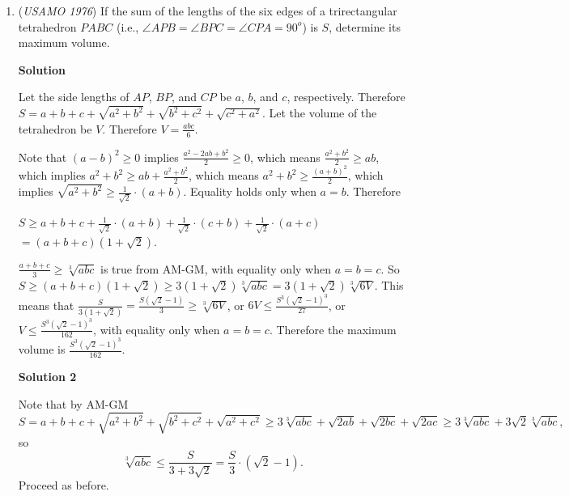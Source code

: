 \begin{enumerate}
 Thus the only solution is the solution above: $(a,b,c)=0$.

 


 
<i>Alternate solutions are always welcome. If you have a different, elegant solution to this problem, please \href{https://artofproblemsolving.com/wiki/index.php?title=1976\_USAMO\_Problems/Problem\_3&action=edit}{add it} to this page.</i>



	\item (\textit{USAMO 1976}) If the sum of the lengths of the six edges of a trirectangular tetrahedron $PABC$ (i.e., $\angle APB=\angle BPC=\angle CPA=90^o$) is $S$, determine its maximum volume.


 



\textbf{Solution}

Let the side lengths of $AP$, $BP$, and $CP$ be $a$, $b$, and $c$, respectively. Therefore $S=a+b+c+\sqrt{a^2+b^2}+\sqrt{b^2+c^2}+\sqrt{c^2+a^2}$. Let the volume of the tetrahedron be $V$. Therefore $V=\frac{abc}{6}$.

 Note that $(a-b)^2\geq 0$ implies $\frac{a^2-2ab+b^2}{2}\geq 0$, which means $\frac{a^2+b^2}{2}\geq ab$, which implies $a^2+b^2\geq ab+\frac{a^2+b^2}{2}$, which means $a^2+b^2\geq \frac{(a+b)^2}{2}$, which implies $\sqrt{a^2+b^2}\geq \frac{1}{\sqrt{2}} \cdot (a+b)$. Equality holds only when $a=b$. Therefore

 $S\geq a+b+c+\frac{1}{\sqrt{2}} \cdot (a+b)+\frac{1}{\sqrt{2}} \cdot (c+b)+\frac{1}{\sqrt{2}} \cdot (a+c)$
$=(a+b+c)(1+\sqrt{2})$.

 $\frac{a+b+c}{3}\geq \sqrt[3]{abc}$ is true from AM-GM, with equality only when $a=b=c$. So $S\geq (a+b+c)(1+\sqrt{2})\geq 3(1+\sqrt{2})\sqrt[3]{abc}=3(1+\sqrt{2})\sqrt[3]{6V}$. This means that $\frac{S}{3(1+\sqrt{2})}=\frac{S(\sqrt{2}-1)}{3}\geq \sqrt[3]{6V}$, or $6V\leq \frac{S^3(\sqrt{2}-1)^3}{27}$, or $V\leq \frac{S^3(\sqrt{2}-1)^3}{162}$, with equality only when $a=b=c$. Therefore the maximum volume is $\frac{S^3(\sqrt{2}-1)^3}{162}$.

 



\textbf{Solution 2}

Note that by AM-GM 
 \[S = a + b + c + \sqrt{a^2 + b^2} + \sqrt{b^2 + c^2} + \sqrt{a^2 + c^2} \ge 3\sqrt[3]{abc} + \sqrt{2ab} + \sqrt{2bc} + \sqrt{2ac} \ge 3\sqrt[3]{abc} + 3\sqrt{2}\sqrt[3]{abc},\]so 
 \[\sqrt[3]{abc} \le \frac{S}{3 + 3\sqrt{2}} = \frac{S}{3} \cdot (\sqrt{2} - 1).\] Proceed as before.


\end{enumerate}
